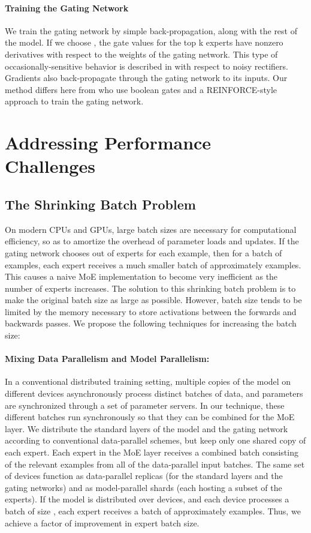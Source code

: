 \documentclass{article} \pdfoutput=1
\begin{document}
\paragraph{Training the Gating Network}
We train the gating network by simple back-propagation, along with the rest of the model.  If we choose , the gate values for the top k experts have nonzero derivatives with respect to the weights of the gating network.  This type of occasionally-sensitive behavior is described in \citep{Bengio13:CondComp} with respect to noisy rectifiers.  Gradients also back-propagate through the gating network to its inputs.   Our method differs here from \citep{Bengio15:CondComp} who use boolean gates and a REINFORCE-style approach to train the gating network. 



\section{Addressing Performance Challenges}
\label{sec:performance}
\subsection{The Shrinking Batch Problem}
On modern CPUs and GPUs, large batch sizes are necessary for computational efficiency, so as to amortize the overhead of parameter loads and updates.  If the gating network chooses  out of  experts for each example, then for a batch of  examples, each expert receives a much smaller batch of approximately  examples.  This causes a naive MoE implementation to become very inefficient as the number of experts increases.  The solution to this shrinking batch problem is to make the original batch size as large as possible.  However, batch size tends to be limited by the memory necessary to store activations between the forwards and backwards passes.  We propose the following techniques for increasing the batch size:

\paragraph{Mixing Data Parallelism and Model Parallelism:}  In a conventional distributed training setting, multiple copies of the model on different devices asynchronously process distinct batches of data, and parameters are synchronized through a set of parameter servers.  In our technique, these different batches run synchronously so that they can be combined for the MoE layer.  We distribute the standard layers of the model and the gating network according to conventional data-parallel schemes, but keep only one shared copy of each expert.  Each expert in the MoE layer receives a combined batch consisting of the relevant examples from all of the data-parallel input batches.   The same set of devices function as data-parallel replicas (for the standard layers and the gating networks) and as model-parallel shards (each hosting a subset of the experts).  If the model is distributed over  devices, and each device processes a batch of size , each expert receives a batch of approximately  examples. Thus, we achieve a factor of  improvement in expert batch size. 
\end{document}
